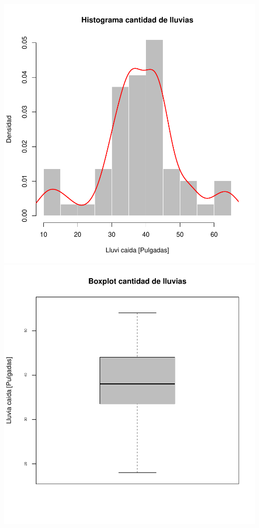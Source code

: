 \documentclass[11pt]{article}
\begin{document}
\begin{center}
    \includegraphics[scale = 0.3]{histll}
    \includegraphics[scale = 0.3]{boxll}
\end{center}
\end{document}
